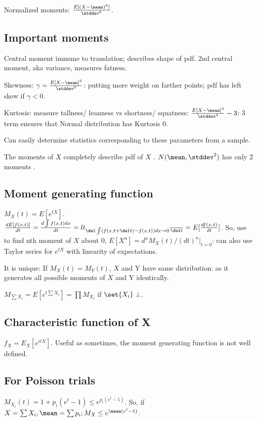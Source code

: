 \documentclass[oneside, article]{memoir}
\begin{document}
Normalized moments: $\frac{E[(X - \mean)^{k}]}{\stddev^{k}}$.

\subsection{Important moments}
Central moment immune to translation; describes shape of pdf. 2nd central moment, aka variance, measures fatness.

Skewness: $\gamma = \frac{E[X - \mean]^{3}}{\stddev^{3}}$: putting more weight on farther points; pdf has left skew if $\gamma<0$.

Kurtosis: measure tallness/ leanness vs shortness/ squatness: $\frac{E[X - \mean]^{4}}{\stddev^{4}} - 3$: 3 term ensures that Normal distribution has Kurtosis 0.

Can easily determine statistics corresponding to these parameters from a sample.

The moments of $X$ completely describe pdf of $X$ \why. $N(\mean, \stddev^{2})$ has only 2 moments \chk.

\subsection{Moment generating function}
$M_{X}(t)=E[e^{tX}]$. \\
$\frac{dE[f(x,t)]}{dt} = \frac{d \int f(x, t) dx}{dt} = lt_{\del\int (f(x, t+\del t) - f(x, t))dx \to 0}\frac{}{\del t} = E[\frac{df(x,t)}{dt}]$. So, use to find nth moment of $X$ about 0, $E[X^{n}]=d^{n}M_{X}(t)/(dt)^{n}|_{t=0}$: can also use Taylor series for $e^{tX}$ with linearity of expectations.

It is unique: If $M_{X}(t) = M_{Y}(t)$, $X$ and Y have same distribution: as it generates all possible moments of $X$ and Y identically. \why

$M_{\sum X_{i}} = E[e^{t \sum X_{i}}] = \prod M_{X_{i}}$ if $\set{X_{i}} \perp$.

\subsection{Characteristic function of X}
$f_{X} = E_{X}[e^{itX}]$. Useful as sometimes, the moment generating function is not well defined.

\subsection{For Poisson trials}
$M_{X_{i}}(t)=1+p_{i}(e^{t}-1) \leq e^{p_{i}(e^{t}-1)}$. So, if $X = \sum X_{i}, \mean = \sum p_{i}; M_{X} \leq e^{\mean(e^{t}-1)}$.
\end{document}
